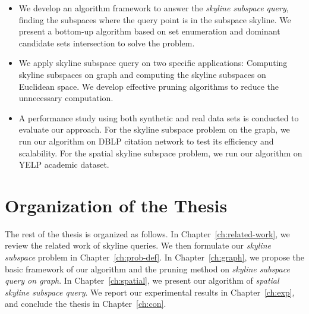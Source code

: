 \begin{itemize}
\item We develop an algorithm framework to answer the \emph{skyline subspace query}, finding the subspaces where the query point is in the subspace skyline. We present a bottom-up algorithm based on set enumeration and dominant candidate sets intersection to solve the problem.

\item We apply skyline subspace query on two specific applications: Computing skyline subspaces on graph and computing the skyline subspaces on Euclidean space. We develop effective pruning algorithms to reduce the unnecessary computation.

\item A performance study using both synthetic and real data sets is conducted to evaluate our approach. For the skyline subspace problem on the graph, we run our algorithm on DBLP citation network to test its efficiency and scalability. For the spatial skyline subspace problem, we run our algorithm on YELP academic dataset.
\end{itemize}
  

\section{Organization of the Thesis}
The rest of the thesis is organized as follows. In Chapter~\ref{ch:related-work}, we review the related work of skyline queries. We then formulate our \emph{skyline subspace} problem in Chapter~\ref{ch:prob-def}. In Chapter~\ref{ch:graph}, we propose the basic framework of our algorithm and the pruning method on \emph{skyline subspace query on graph}.  In Chapter~\ref{ch:spatial}, we present our algorithm of \emph{spatial skyline subspace query}.  We report our experimental results in Chapter~\ref{ch:exp}, and conclude the thesis in Chapter~\ref{ch:con}.










